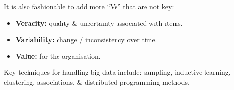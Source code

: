 \documentclass[a4paper,11pt]{article}
\begin{document}
It is also fashionable to add more ``Vs'' that are not key:
\begin{itemize}
    \item   \textbf{Veracity:} quality \& uncertainty associated with items.
    \item   \textbf{Variability:} change / inconsistency over time.
    \item   \textbf{Value:} for the organisation.
\end{itemize}

Key techniques for handling big data include: sampling, inductive learning, clustering, associations, \& distributed 
programming methods.
\end{document}
